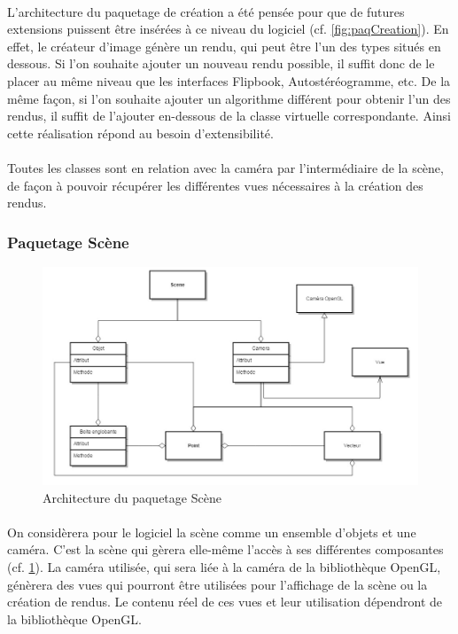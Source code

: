 \paragraph{}
L’architecture du paquetage de création a été pensée pour que de futures extensions puissent être insérées à ce niveau du logiciel (cf. \ref{fig:paqCreation}). En effet, le créateur d’image génère un rendu, qui peut être l’un des types situés en dessous. Si l’on souhaite ajouter un nouveau rendu possible, il suffit donc de le placer au même niveau que les interfaces Flipbook, Autostéréogramme, etc. De la même façon, si l’on souhaite ajouter un algorithme différent pour obtenir l’un des rendus, il suffit de l’ajouter en-dessous de la classe virtuelle correspondante. Ainsi cette réalisation répond au besoin d’extensibilité.

\paragraph{}
Toutes les classes sont en relation avec la caméra par l’intermédiaire de la scène, de façon à pouvoir récupérer les différentes vues nécessaires à la création des rendus.

\subsubsection{Paquetage Scène}

\begin{figure}[h]
		\centering
		\includegraphics[scale=0.4]{package_scene.jpg}
		\caption{\label{fig:paqScene} Architecture du paquetage Scène}
\end{figure}

\paragraph{}
On considèrera pour le logiciel la scène comme un ensemble d’objets et une caméra. C’est la scène qui gèrera elle-même l’accès à ses différentes composantes (cf. \ref{fig:paqScene}). La caméra utilisée, qui sera liée à la caméra de la bibliothèque OpenGL, génèrera des vues qui pourront être utilisées pour l’affichage de la scène ou la création de rendus. Le contenu réel de ces vues et leur utilisation dépendront de la bibliothèque OpenGL.


